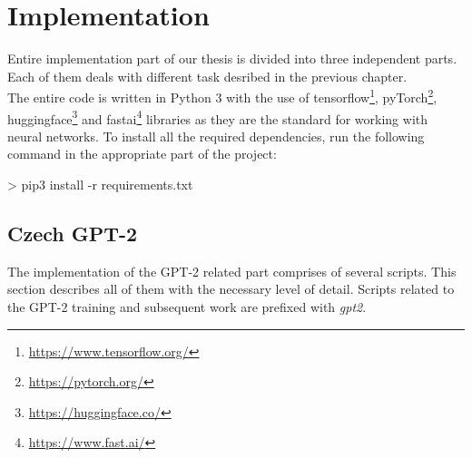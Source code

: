 \chapter{Implementation}
Entire implementation part of our thesis is divided into three independent parts. Each of them deals with different task desribed in the previous chapter.\\

The entire code is written in Python 3 with the use of tensorflow\footnote[1]{\url{https://www.tensorflow.org/}}, pyTorch\footnote[2]{\url{https://pytorch.org/}}, huggingface\footnote[3]{\url{https://huggingface.co/}} and fastai\footnote[4]{\url{https://www.fast.ai/}} libraries as they are the standard for working with neural networks. To install all the required dependencies, run the following command in the appropriate part of the project:

\begin{code}
> pip3 install -r requirements.txt
\end{code}

\section{Czech GPT-2}
The implementation of the GPT-2 related part comprises of several scripts. This section describes all of them with the necessary level of detail. Scripts related to the GPT-2 training and subsequent work are prefixed with \textit{gpt2}.


